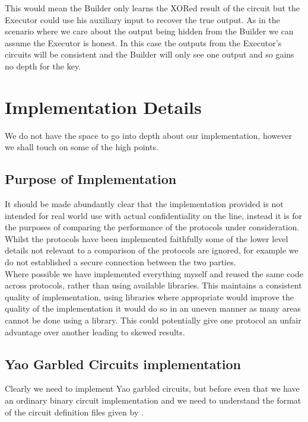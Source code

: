 \documentclass[ %
                    author={Nicholas Tutte},
                supervisor={Prof. Nigel Smart},
                    degree={MEng},
                     title={Secure Two Party Computation},
                  subtitle={A practical comparison of recent protocols},
                      type={Research - GG1K},
                      year={2015} ]{dissertation}
\begin{document}
				This would mean the Builder only learns the XORed result of the circuit but the Executor could use his auxiliary input to recover the true output. As in the scenario where we care about the output being hidden from the Builder we can assume the Executor is honest. In this case the outputs from the Executor's circuits will be consistent and the Builder will only see one output and so gains no depth for the key.\\

	\chapter{Implementation Details} \label{sec:ImplementationDetails}
		We do not have the space to go into depth about our implementation, however we shall touch on some of the high points.

		\section*{Purpose of Implementation}
			It should be made abundantly clear that the implementation provided is not intended for real world use with actual confidentiality on the line, instead it is for the purposes of comparing the performance of the protocols under consideration.\\

			Whilst the protocols have been implemented faithfully some of the lower level details not relevant to a comparison of the protocols are ignored, for example we do not established a secure connection between the two parties.\\

			Where possible we have implemented everything myself and reused the same code across protocols, rather than using available libraries. This maintains a consistent quality of implementation, using libraries where appropriate would improve the quality of the implementation it would do so in an uneven manner as many areas cannot be done using a library. This could potentially give one protocol an unfair advantage over another leading to skewed results.

		\section{Yao Garbled Circuits implementation}

			Clearly we need to implement Yao garbled circuits, but before even that we have an ordinary binary circuit implementation and we need to understand the format of the circuit definition files given by \cite{NigelCircuits}.
\end{document}
